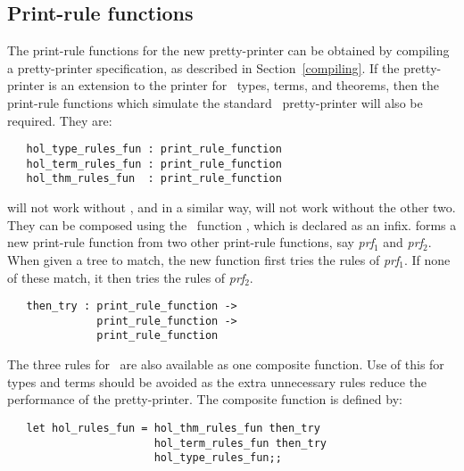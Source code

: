 \subsection{Print-rule functions}

The print-rule functions for the new pretty-printer can be obtained by
compiling a pretty-printer specification, as described in
Section~\ref{compiling}. If the pretty-printer is an extension to the printer
for \HOL\ types, terms, and theorems, then the print-rule functions which
simulate the standard \HOL\ pretty-printer will also be required. They are:

\begin{boxed}\begin{verbatim}
   hol_type_rules_fun : print_rule_function
   hol_term_rules_fun : print_rule_function
   hol_thm_rules_fun  : print_rule_function
\end{verbatim}\end{boxed}

\noindent
{} will not work without ,
and in a similar way,  will not work without the other
two. They can be composed using the
\ML\ function , which is declared as an infix. 
forms a new print-rule function from two other print-rule functions, say
{\it prf}$_1$ and {\it prf}$_2$. When given a tree to match, the new function
first tries the rules of {\it prf}$_1$. If none of these match, it then tries
the rules of {\it prf}$_2$.

\begin{boxed}\begin{verbatim}
   then_try : print_rule_function ->
              print_rule_function ->
              print_rule_function
\end{verbatim}\end{boxed}

\noindent
The three rules for \HOL\ are also available as one composite function. Use of
this for types and terms should be avoided as the extra unnecessary rules
reduce the performance of the pretty-printer. The composite function is
defined by:

\begin{boxed}\begin{verbatim}
   let hol_rules_fun = hol_thm_rules_fun then_try
                       hol_term_rules_fun then_try
                       hol_type_rules_fun;;
\end{verbatim}\end{boxed}

